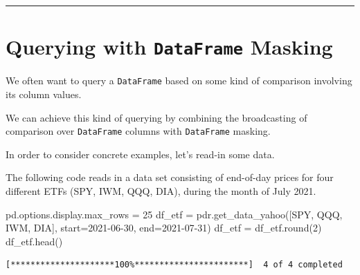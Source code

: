 \documentclass[
  letterpaper,
  DIV=11,
  numbers=noendperiod]{scrreprt}
\newenvironment{Shaded}{\begin{snugshade}}{\end{snugshade}}
\newcommand{\BuiltInTok}[1]{\textcolor[rgb]{0.00,0.23,0.31}{#1}}
\newcommand{\DecValTok}[1]{\textcolor[rgb]{0.68,0.00,0.00}{#1}}
\newcommand{\NormalTok}[1]{\textcolor[rgb]{0.00,0.23,0.31}{#1}}
\newcommand{\OperatorTok}[1]{\textcolor[rgb]{0.37,0.37,0.37}{#1}}
\newcommand{\StringTok}[1]{\textcolor[rgb]{0.13,0.47,0.30}{#1}}
\begin{document}
\begin{center}\rule{0.5\linewidth}{0.5pt}\end{center}

\hypertarget{querying-with-dataframe-masking}{%
\section{\texorpdfstring{Querying with \texttt{DataFrame}
Masking}{Querying with DataFrame Masking}}\label{querying-with-dataframe-masking}}

We often want to query a \texttt{DataFrame} based on some kind of
comparison involving its column values.

We can achieve this kind of querying by combining the broadcasting of
comparison over \texttt{DataFrame} columns with \texttt{DataFrame}
masking.

In order to consider concrete examples, let's read-in some data.

The following code reads in a data set consisting of end-of-day prices
for four different ETFs (SPY, IWM, QQQ, DIA), during the month of July
2021.

\begin{Shaded}
\begin{Highlighting}[]
\NormalTok{pd.options.display.max\_rows }\OperatorTok{=} \DecValTok{25}
\NormalTok{df\_etf }\OperatorTok{=}\NormalTok{ pdr.get\_data\_yahoo([}\StringTok{\textquotesingle{}SPY\textquotesingle{}}\NormalTok{, }\StringTok{\textquotesingle{}QQQ\textquotesingle{}}\NormalTok{, }\StringTok{\textquotesingle{}IWM\textquotesingle{}}\NormalTok{, }\StringTok{\textquotesingle{}DIA\textquotesingle{}}\NormalTok{], start}\OperatorTok{=}\StringTok{\textquotesingle{}2021{-}06{-}30\textquotesingle{}}\NormalTok{, end}\OperatorTok{=}\StringTok{\textquotesingle{}2021{-}07{-}31\textquotesingle{}}\NormalTok{)}
\NormalTok{df\_etf }\OperatorTok{=}\NormalTok{ df\_etf.}\BuiltInTok{round}\NormalTok{(}\DecValTok{2}\NormalTok{)}
\NormalTok{df\_etf.head()}
\end{Highlighting}
\end{Shaded}

\begin{verbatim}
[*********************100%***********************]  4 of 4 completed
\end{verbatim}
\end{document}

